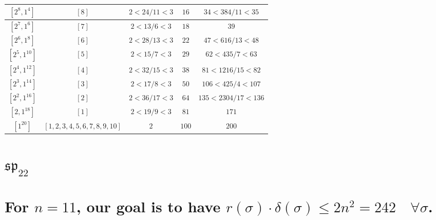 \documentclass{article}%
\begin{document}
\begin{center}
\begin{longtable}{||c|c|c|c|c||}
$[2^{8}, 1^{4}]$ & $[8]$ & $2 < 24/11 < 3$ & $16$ & $34 < 384/11 < 35$ \\ \hline 
$[2^{7}, 1^{6}]$ & $[7]$ & $2 < 13/6 < 3$ & $18$ & $39$ \\ \hline 
$[2^{6}, 1^{8}]$ & $[6]$ & $2 < 28/13 < 3$ & $22$ & $47 < 616/13 < 48$ \\ \hline 
$[2^{5}, 1^{10}]$ & $[5]$ & $2 < 15/7 < 3$ & $29$ & $62 < 435/7 < 63$ \\ \hline 
$[2^{4}, 1^{12}]$ & $[4]$ & $2 < 32/15 < 3$ & $38$ & $81 < 1216/15 < 82$ \\ \hline 
$[2^{3}, 1^{14}]$ & $[3]$ & $2 < 17/8 < 3$ & $50$ & $106 < 425/4 < 107$ \\ \hline 
$[2^{2}, 1^{16}]$ & $[2]$ & $2 < 36/17 < 3$ & $64$ & $135 < 2304/17 < 136$ \\ \hline 
$[2, 1^{18}]$ & $[1]$ & $2 < 19/9 < 3$ & $81$ & $171$ \\ \hline 
$[1^{20}]$ & $[1, 2, 3, 4, 5, 6, 7, 8, 9, 10]$ & $2$ & $100$ & $200$ \\ \hline 
    \end{longtable}
    \end{center}
\newpage

%
\section{$\mathfrak{sp}_{22}$}%
\section*{For $n=11$, our goal is to have $r(\sigma) \cdot \delta(\sigma) \leq 2n^2 = 242 \quad \forall \sigma$.}%

%
\linebreak%
\end{document}
